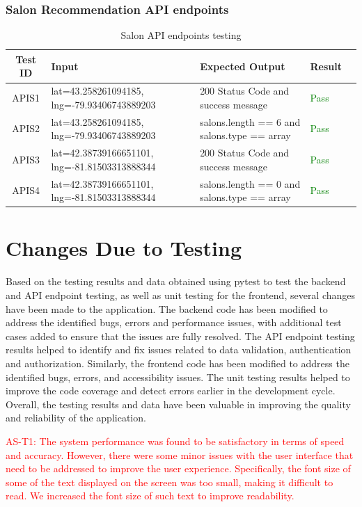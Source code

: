 \documentclass[12pt, oneside, openany, titlepage]{article}
\begin{document}
\subsubsection{Salon Recommendation API endpoints}
\begin{table}[ht!]
\noindent
    \centering
    \begin{tabular}{|c|p{}|p{}|p{}|c|}
    \hline
        \textbf{Test ID} & \textbf{Input} & \textbf{Expected Output} & \textbf{Result} \\ \hline
        APIS1 & lat=43.258261094185, lng=-79.93406743889203 & 200 Status Code and success message & \textcolor{green}{Pass} \\ \hline
        APIS2 & lat=43.258261094185, lng=-79.93406743889203 & salons.length == 6 and salons.type == array & \textcolor{green}{Pass} \\ \hline
        APIS3 & lat=42.38739166651101, lng=-81.81503313888344 & 200 Status Code and success message & \textcolor{green}{Pass} \\ \hline
        APIS4 & lat=42.38739166651101, lng=-81.81503313888344 & salons.length == 0 and salons.type == array & \textcolor{green}{Pass} \\ \hline
    \end{tabular}
    \caption{Salon API endpoints testing}
\end{table}
\newpage
\section{Changes Due to Testing}
Based on the testing results and data obtained using pytest to test the backend and API endpoint testing, as well as unit testing for the frontend, several changes have been made to the application. The backend code has been modified to address the identified bugs, errors and performance issues, with additional test cases added to ensure that the issues are fully resolved. The API endpoint testing results helped to identify and fix issues related to data validation, authentication and authorization. Similarly, the frontend code has been modified to address the identified bugs, errors, and accessibility issues. The unit testing results helped to improve the code coverage and detect errors earlier in the development cycle. Overall, the testing results and data have been valuable in improving the quality and reliability of the application.

\textcolor{red}{AS-T1: The system performance was found to be satisfactory in terms of speed and accuracy. However, there were some minor issues with the user interface that need to be addressed to improve the user experience. Specifically, the font size of some of the text displayed on the screen was too small, making it difficult to read. We increased the font size of such text to improve readability.}
\end{document}
